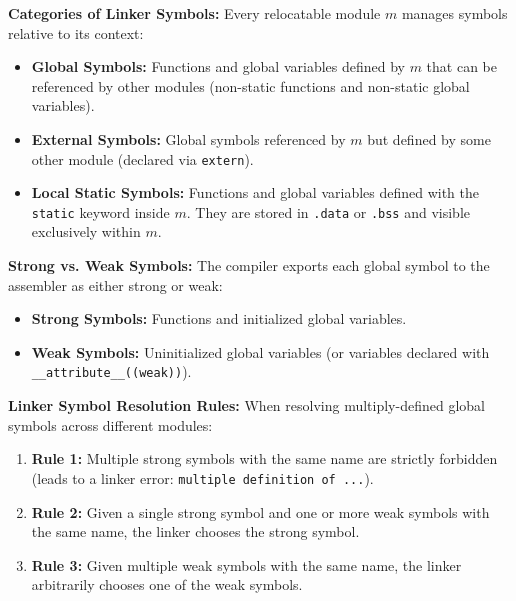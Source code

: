 \begin{definition}
    \textbf{Categories of Linker Symbols:} Every relocatable module $m$ manages symbols relative to its context:
    \begin{itemize}
        \item \textbf{Global Symbols:} Functions and global variables defined by $m$ that can be referenced by other modules (non-static functions and non-static global variables).
        \item \textbf{External Symbols:} Global symbols referenced by $m$ but defined by some other module (declared via \texttt{extern}).
        \item \textbf{Local Static Symbols:} Functions and global variables defined with the \texttt{static} keyword inside $m$. They are stored in \texttt{.data} or \texttt{.bss} and visible exclusively within $m$.
    \end{itemize}
\end{definition}

\begin{definition}
    \textbf{Strong vs. Weak Symbols:} The compiler exports each global symbol to the assembler as either strong or weak:
    \begin{itemize}
        \item \textbf{Strong Symbols:} Functions and initialized global variables.
        \item \textbf{Weak Symbols:} Uninitialized global variables (or variables declared with \texttt{\_\_attribute\_\_((weak))}).
    \end{itemize}
\end{definition}

\begin{theorem}
    \textbf{Linker Symbol Resolution Rules:} When resolving multiply-defined global symbols across different modules:
    \begin{enumerate}
        \item \textbf{Rule 1:} Multiple strong symbols with the same name are strictly forbidden (leads to a linker error: \texttt{multiple definition of ...}).
        \item \textbf{Rule 2:} Given a single strong symbol and one or more weak symbols with the same name, the linker chooses the strong symbol.
        \item \textbf{Rule 3:} Given multiple weak symbols with the same name, the linker arbitrarily chooses one of the weak symbols.
    \end{enumerate}
\end{theorem}

